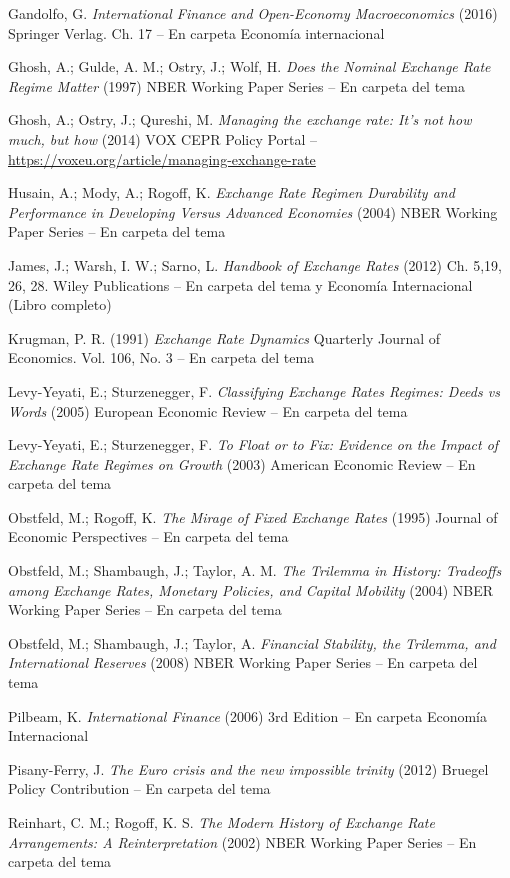 \documentclass{nuevotema}
\begin{document}
Gandolfo, G. \textit{International Finance and Open-Economy Macroeconomics} (2016) Springer Verlag. Ch. 17 -- En carpeta Economía internacional

Ghosh, A.; Gulde, A. M.; Ostry, J.; Wolf, H. \textit{Does the Nominal Exchange Rate Regime Matter} (1997) NBER Working Paper Series -- En carpeta del tema

Ghosh, A.; Ostry, J.; Qureshi, M. \textit{Managing the exchange rate: It's not how much, but how} (2014) VOX CEPR Policy Portal -- \url{https://voxeu.org/article/managing-exchange-rate}

Husain, A.; Mody, A.; Rogoff, K. \textit{Exchange Rate Regimen Durability and Performance in Developing Versus Advanced Economies} (2004) NBER Working Paper Series -- En carpeta del tema

James, J.; Warsh, I. W.; Sarno, L. \textit{Handbook of Exchange Rates} (2012) Ch. 5,19, 26, 28. Wiley Publications -- En carpeta del tema y Economía Internacional (Libro completo)

Krugman, P. R. (1991) \textit{Exchange Rate Dynamics} Quarterly Journal of Economics. Vol. 106, No. 3 -- En carpeta del tema

Levy-Yeyati, E.; Sturzenegger, F. \textit{Classifying Exchange Rates Regimes: Deeds vs Words} (2005) European Economic Review -- En carpeta del tema

Levy-Yeyati, E.; Sturzenegger, F. \textit{To Float or to Fix: Evidence on the Impact of Exchange Rate Regimes on Growth} (2003) American Economic Review -- En carpeta del tema

Obstfeld, M.; Rogoff, K. \textit{The Mirage of Fixed Exchange Rates} (1995) Journal of Economic Perspectives -- En carpeta del tema

Obstfeld, M.; Shambaugh, J.; Taylor, A. M. \textit{The Trilemma in History: Tradeoffs among Exchange Rates, Monetary Policies, and Capital Mobility} (2004) NBER Working Paper Series -- En carpeta del tema

Obstfeld, M.; Shambaugh, J.; Taylor, A. \textit{Financial Stability, the Trilemma, and International Reserves} (2008) NBER Working Paper Series -- En carpeta del tema

Pilbeam, K. \textit{International Finance} (2006) 3rd Edition -- En carpeta Economía Internacional

Pisany-Ferry, J. \textit{The Euro crisis and the new impossible trinity} (2012) Bruegel Policy Contribution -- En carpeta del tema


Reinhart, C. M.; Rogoff, K. S. \textit{The Modern History of Exchange Rate Arrangements: A Reinterpretation} (2002) NBER Working Paper Series -- En carpeta del tema
\end{document}
